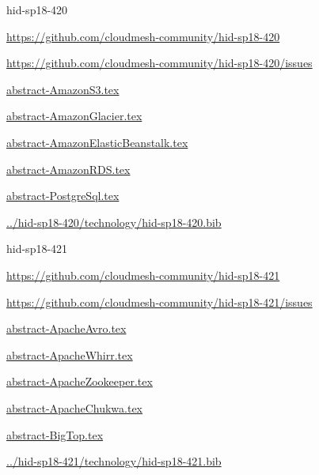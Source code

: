 \begin{IU}

hid-sp18-420

\url{https://github.com/cloudmesh-community/hid-sp18-420}

\url{https://github.com/cloudmesh-community/hid-sp18-420/issues}

\href{https://github.com/cloudmesh-community/hid-sp18-420/blob/master//technology/abstract-AmazonS3.tex}{abstract-AmazonS3.tex}

\href{https://github.com/cloudmesh-community/hid-sp18-420/blob/master//technology/abstract-AmazonGlacier.tex}{abstract-AmazonGlacier.tex}

\href{https://github.com/cloudmesh-community/hid-sp18-420/blob/master//technology/abstract-AmazonElasticBeanstalk.tex}{abstract-AmazonElasticBeanstalk.tex}

\href{https://github.com/cloudmesh-community/hid-sp18-420/blob/master//technology/abstract-AmazonRDS.tex}{abstract-AmazonRDS.tex}

\href{https://github.com/cloudmesh-community/hid-sp18-420/blob/master//technology/abstract-PostgreSql.tex}{abstract-PostgreSql.tex}

\href{https://github.com/cloudmesh-community/hid-sp18-420/blob/master//technology/hid-sp18-420.bib}{../hid-sp18-420/technology/hid-sp18-420.bib}

\end{IU}


\begin{IU}

hid-sp18-421

\url{https://github.com/cloudmesh-community/hid-sp18-421}

\url{https://github.com/cloudmesh-community/hid-sp18-421/issues}

\href{https://github.com/cloudmesh-community/hid-sp18-421/blob/master//technology/abstract-ApacheAvro.tex}{abstract-ApacheAvro.tex}

\href{https://github.com/cloudmesh-community/hid-sp18-421/blob/master//technology/abstract-ApacheWhirr.tex}{abstract-ApacheWhirr.tex}

\href{https://github.com/cloudmesh-community/hid-sp18-421/blob/master//technology/abstract-ApacheZookeeper.tex}{abstract-ApacheZookeeper.tex}

\href{https://github.com/cloudmesh-community/hid-sp18-421/blob/master//technology/abstract-ApacheChukwa.tex}{abstract-ApacheChukwa.tex}

\href{https://github.com/cloudmesh-community/hid-sp18-421/blob/master//technology/abstract-BigTop.tex}{abstract-BigTop.tex}

\href{https://github.com/cloudmesh-community/hid-sp18-421/blob/master//technology/hid-sp18-421.bib}{../hid-sp18-421/technology/hid-sp18-421.bib}

\end{IU}


